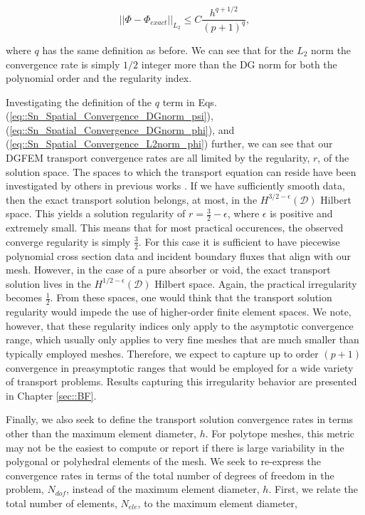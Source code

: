 \begin{equation}
\label{eq::Sn_Spatial_Convergence_L2norm_phi}
|| \Phi - \Phi_{exact} ||_{L_2} \leq C \frac{h^{q+1/2}}{(p+1)^q},
\end{equation}

\noindent where $q$ has the same definition as before. We can see that for the $L_2$ norm the convergence rate is simply $1/2$ integer more than the DG norm for both the polynomial order and the regularity index.

Investigating the definition of the $q$ term in Eqs. (\ref{eq::Sn_Spatial_Convergence_DGnorm_psi}), (\ref{eq::Sn_Spatial_Convergence_DGnorm_phi}), and (\ref{eq::Sn_Spatial_Convergence_L2norm_phi}) further, we can see that our DGFEM transport convergence rates are all limited by the regularity, $r$, of the solution space. The spaces to which the transport equation can reside have been investigated by others in previous works \cite{wang2009convergence,magenes1970problemes,johnson1983convergence}. If we have sufficiently smooth data, then the exact transport solution belongs, at most, in the $H^{3/2-\epsilon} (\mathcal{D})$ Hilbert space. This yields a solution regularity of $r=\frac{3}{2}-\epsilon$, where $\epsilon$ is positive and extremely small. This means that for most practical occurences, the observed converge regularity is simply $\frac{3}{2}$. For this case it is sufficient to have piecewise polynomial cross section data and incident boundary fluxes that align with our mesh. However, in the case of a pure absorber or void, the exact transport solution lives in the $H^{1/2-\epsilon} (\mathcal{D})$ Hilbert space. Again, the practical irregularity becomes $\frac{1}{2}$. From these spaces, one would think that the transport solution regularity would impede the use of higher-order finite element spaces. We note, however, that these regularity indices only apply to the asymptotic convergence range, which usually only applies to very fine meshes that are much smaller than typically employed meshes. Therefore, we expect to capture up to order $(p+1)$ convergence in preasymptotic ranges that would be employed for a wide variety of transport problems. Results capturing this irregularity behavior are presented in Chapter \ref{sec::BF}.

Finally, we also seek to define the transport solution convergence rates in terms other than the maximum element diameter, $h$. For polytope meshes, this metric may not be the easiest to compute or report if there is large variability in the polygonal or polyhedral elements of the mesh. We seek to re-express the convergence rates in terms of the total number of degrees of freedom in the problem, $N_{dof}$, instead of the maximum element diameter, $h$. First, we relate the total number of elements, $N_{ele}$, to the maximum element diameter,

